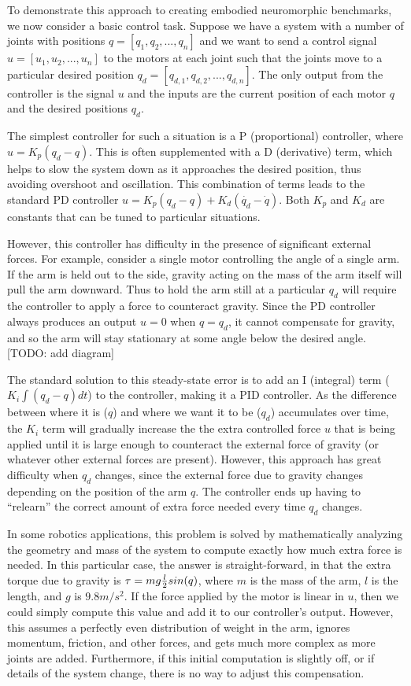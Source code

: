 \documentclass{frontiersSCNS} %
\begin{document}
To demonstrate this approach to creating embodied neuromorphic benchmarks,
we now consider a basic control task.  Suppose we have a system with a number
of joints with positions $q = [q_1, q_2, ..., q_n]$ and we want to send a control signal $u = [u_1, u_2, ..., u_n]$ to the motors at each joint
such that
the joints move to a particular desired position $q_d = [q_{d,1}, q_{d,2}, ..., q_{d,n}]$.  The only output from the controller is
the signal $u$ and the inputs are the current position
of each motor $q$ and the desired positions $q_d$.

The simplest controller for such a situation is a P (proportional) controller,
where $u=K_p(q_d - q)$.  This is often supplemented with a D (derivative) term,
which helps to slow the system down as it approaches the desired position,
thus avoiding overshoot and oscillation. This combination of terms leads to the
standard PD controller $u=K_p(q_d - q) + K_d(\dot{q_d} - \dot{q})$.
Both $K_p$ and $K_d$ are constants that can be
tuned to particular situations.

However, this controller has difficulty in the presence of significant external
forces.  For example, consider a single motor controlling the angle of a single
arm.  If the arm is held out to the side, gravity acting on the mass of the
arm itself will pull the arm downward.  Thus to hold the arm still at a
particular $q_d$ will require the controller to apply a force to counteract
gravity.  Since the PD controller always produces an output $u=0$ when $q=q_d$,
it cannot compensate for gravity, and so the arm will stay stationary at some
angle below the desired angle. [TODO: add diagram]

The standard solution to this steady-state error is to add an I (integral) term ($K_i \int{(q_d-q) dt}$)
to the controller, making it a PID controller.  As the difference between where it is ($q$) and
where we want it to be ($q_d$) accumulates over time, the $K_i$ term will gradually increase the
the extra controlled force $u$ that is being applied until it is large enough to counteract
the external force of gravity (or whatever other external forces are present).
However, this approach has great difficulty when $q_d$ changes, since the
external force due to gravity changes depending on the position of the arm $q$.
The controller ends up having to ``relearn'' the
correct amount of extra force needed every time $q_d$ changes.

In some robotics applications, this problem is solved by mathematically
analyzing the geometry and mass of the system to compute exactly how much extra
force is needed.  In this particular case, the answer is straight-forward,
in that the extra torque due to gravity is $\tau=mg {l \over 2} sin(q)$, where
$m$ is the mass of the arm, $l$ is the length, and $g$ is $9.8m/s^2$.  If the
force applied by the motor is linear in $u$, then we could simply compute this
value and add it to our controller's output.  However, this assumes a perfectly
even distribution of weight in the arm, ignores momentum, friction, and other forces, and 
gets much more complex as more joints are added.  Furthermore, if this
initial computation is slightly off, or if details of the system change,
there is no way to adjust this compensation.
\end{document}
